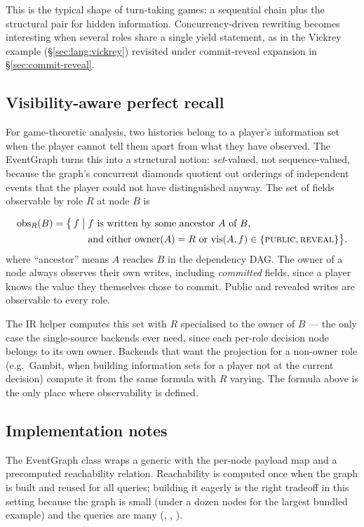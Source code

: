 This is the typical shape of turn-taking games: a sequential
chain plus the structural pair for hidden information.
Concurrency-driven rewriting becomes interesting when several
roles share a single yield statement, as in the Vickrey example
(\S\ref{sec:lang:vickrey}) revisited under commit-reveal
expansion in \S\ref{sec:commit-reveal}.

\subsection{Visibility-aware perfect recall}
\label{sec:eventgraph:visibility-recall}

For game-theoretic analysis, two histories belong to a player's
information set when the player cannot tell them apart from what
they have observed.  The EventGraph turns this into a structural
notion: \emph{set}-valued, not sequence-valued, because the
graph's concurrent diamonds quotient out orderings of independent
events that the player could not have distinguished anyway.  The
set of fields observable by role $R$ at node $B$ is

\begin{align*}
  \mathrm{obs}_R(B) = \bigl\{\, f \;\big|\;&
    f \text{ is written by some ancestor } A \text{ of } B,\\
  & \text{and either } \mathrm{owner}(A) = R
    \text{ or } \mathrm{vis}(A,f) \in \{\textsc{public}, \textsc{reveal}\} \bigr\}.
\end{align*}
where ``ancestor'' means $A$ reaches $B$ in the dependency DAG.
The owner of a node always observes their own writes, including
\emph{committed} fields, since a player knows the value they
themselves chose to commit.  Public and revealed writes are
observable to every role.

The IR helper  computes this set with
$R$ specialised to the owner of $B$ --- the only case the
single-source backends ever need, since each per-role decision
node belongs to its own owner.  Backends that want the
projection for a non-owner role (e.g.\ Gambit, when building
information sets for a player not at the current decision)
compute it from the same formula with $R$ varying.  The
formula above is the only place where observability is
defined.

\subsection{Implementation notes}

The EventGraph class wraps a generic  with the
per-node payload map and a precomputed reachability relation.
Reachability is computed once when the graph is built and reused
for all queries; building it eagerly is the right tradeoff in
this setting because the graph is small (under a dozen nodes
for the largest bundled example) and the queries are many
(, , ).

